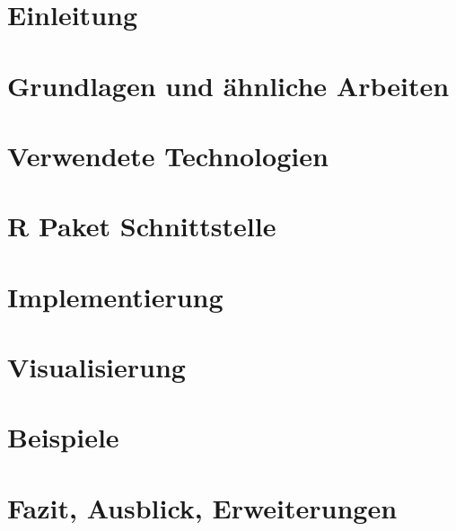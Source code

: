 \chapter{Einleitung}
\label{cha:introduction}


\chapter{Grundlagen und ähnliche Arbeiten}
\label{cha:basics}


\chapter{Verwendete Technologien}
\label{cha:technologies}


\chapter{R Paket Schnittstelle}
\label{cha:interface}


\chapter{Implementierung}
\label{cha:implemenation}


\chapter{Visualisierung}
\label{cha:visualization}


\chapter{Beispiele}
\label{cha:examples}


\chapter{Fazit, Ausblick, Erweiterungen}
\label{cha:result}
